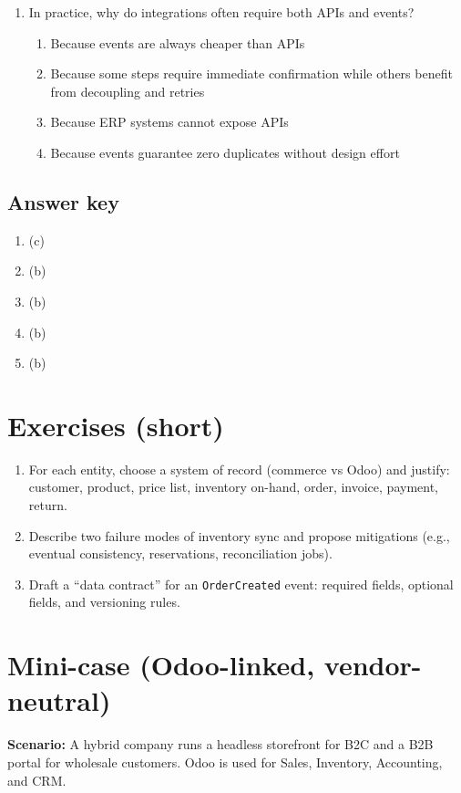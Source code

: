 \begin{enumerate}
  \item In practice, why do integrations often require both APIs and events?
  \begin{enumerate}
    \item Because events are always cheaper than APIs
    \item Because some steps require immediate confirmation while others benefit from decoupling and retries
    \item Because ERP systems cannot expose APIs
    \item Because events guarantee zero duplicates without design effort
  \end{enumerate}
\end{enumerate}

\subsection*{Answer key}
\begin{enumerate}
  \item (c)
  \item (b)
  \item (b)
  \item (b)
  \item (b)
\end{enumerate}

\section{Exercises (short)}
\begin{enumerate}
  \item For each entity, choose a system of record (commerce vs Odoo) and justify: customer, product, price list, inventory on-hand, order, invoice, payment, return.
  \item Describe two failure modes of inventory sync and propose mitigations (e.g., eventual consistency, reservations, reconciliation jobs).
  \item Draft a ``data contract'' for an \texttt{OrderCreated} event: required fields, optional fields, and versioning rules.
\end{enumerate}

\section{Mini-case (Odoo-linked, vendor-neutral)}
\textbf{Scenario:} A hybrid company runs a headless storefront for B2C and a B2B portal for wholesale customers. Odoo is used for Sales, Inventory, Accounting, and CRM.

